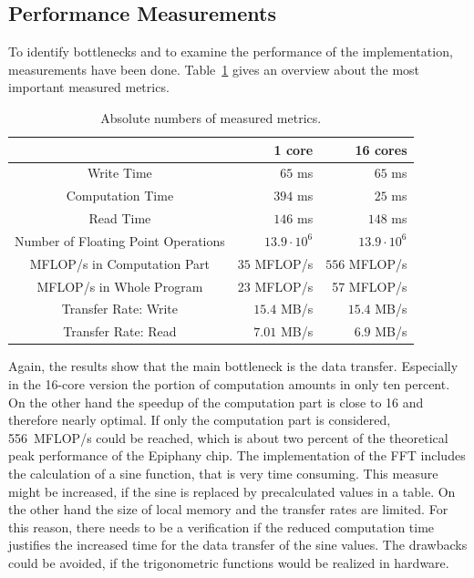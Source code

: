 \documentclass[american, hauptseminar, twoside]{zihpub}
\begin{document}
					\subsection{Performance Measurements}
						To identify bottlenecks and to examine the performance of the implementation, measurements have been done. Table~\ref{tab:meas} gives an overview about the most important measured metrics.
						\begin{table}[h]
							\centering
							\renewcommand{\arraystretch}{1.5}
							\begin{tabular}{|c||r|r|}								
								\hline
													& 1 core	& 16 cores	\\ 
								\hline \hline
								Write Time	& $65$ ms		& $65$ ms \\
								\hline
								Computation Time & $394$ ms & $25$ ms \\
								\hline 
								Read Time	& $146$ ms 	& $148$ ms \\
								\hline
								Number of Floating Point Operations & $13.9 \cdot 10^6$ & $13.9 \cdot 10^6$ \\
								\hline
								MFLOP/s in Computation Part & $35$ MFLOP/s & $556$ MFLOP/s \\
								\hline
								MFLOP/s in Whole Program & 23 MFLOP/s & 57 MFLOP/s \\
								\hline
								Transfer Rate: Write	& $15.4$ MB/s & $15.4$ MB/s \\
								\hline
								Transfer Rate: Read	& $7.01$ MB/s & $6.9$ MB/s \\
								\hline
								\end{tabular}
							\caption{Absolute numbers of measured metrics.}
							\label{tab:meas}
						\end{table}
						Again, the results show that the main bottleneck is the data transfer. Especially in the 16-core version the portion of computation amounts in only ten percent. On the other hand the speedup of the computation part is close to 16 and therefore nearly optimal. If only the computation part is considered, 556~MFLOP/s could be reached, which is about two percent of the theoretical peak performance of the Epiphany chip. The implementation of the FFT includes the calculation of a sine function, that is very time consuming. This measure might be increased, if the sine is replaced by precalculated values in a table. On the other hand the size of local memory and the transfer rates are limited. For this reason, there needs to be a verification if the reduced computation time justifies the increased time for the data transfer of the sine values. The drawbacks could be avoided, if the trigonometric functions would be realized in hardware.
						
\end{document}
